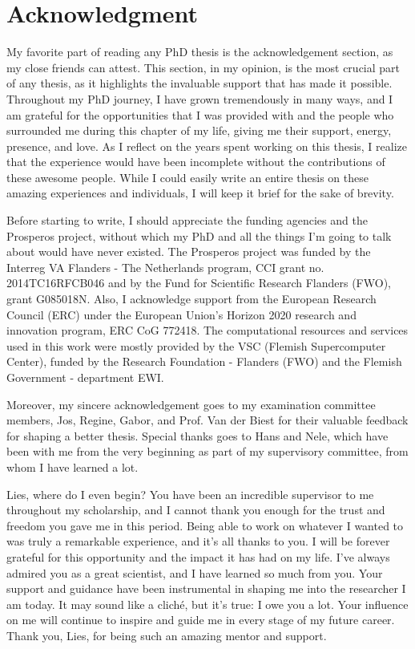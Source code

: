 \chapter*{Acknowledgment}                                  \label{ch:preface}

My favorite part of reading any PhD thesis is the acknowledgement section, as my close friends can attest. This section, in my opinion, is the most crucial part of any thesis, as it highlights the invaluable support that has made it possible. Throughout my PhD journey, I have grown tremendously in many ways, and I am grateful for the opportunities that I was provided with and the people who surrounded me during this chapter of my life, giving me their support, energy, presence, and love. As I reflect on the years spent working on this thesis, I realize that the experience would have been incomplete without the contributions of these awesome people. While I could easily write an entire thesis on these amazing experiences and individuals, I will keep it brief for the sake of brevity.

Before starting to write, I should appreciate the funding agencies and the Prosperos project, without which my PhD and all the things I’m going to talk about would have never existed. The Prosperos project was funded by the Interreg VA Flanders - The Netherlands program, CCI grant no. 2014TC16RFCB046 and by the Fund for Scientific Research Flanders (FWO), grant G085018N. Also, I acknowledge support from the European Research Council (ERC) under the European Union's Horizon 2020 research and innovation program, ERC CoG 772418. The computational resources and services used in this work were mostly provided by the VSC (Flemish Supercomputer Center), funded by the Research Foundation - Flanders (FWO) and the Flemish Government - department EWI. 

Moreover, my sincere acknowledgement goes to my examination committee members, Jos, Regine, Gabor, and Prof. Van der Biest for their valuable feedback for shaping a better thesis. Special thanks goes to Hans and Nele, which have been with me from the very beginning as part of my supervisory committee, from whom I have learned a lot.

Lies, where do I even begin? You have been an incredible supervisor to me throughout my scholarship, and I cannot thank you enough for the trust and freedom you gave me in this period. Being able to work on whatever I wanted to was truly a remarkable experience, and it's all thanks to you. I will be forever grateful for this opportunity and the impact it has had on my life. I've always admired you as a great scientist, and I have learned so much from you. Your support and guidance have been instrumental in shaping me into the researcher I am today. It may sound like a cliché, but it's true: I owe you a lot. Your influence on me will continue to inspire and guide me in every stage of my future career. Thank you, Lies, for being such an amazing mentor and support.

